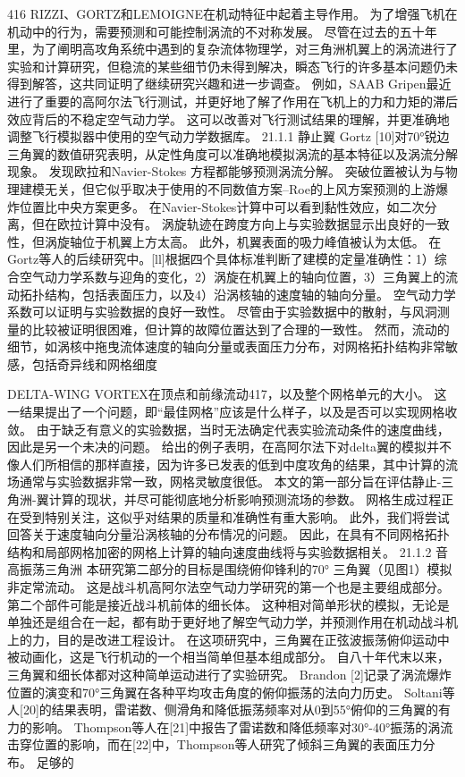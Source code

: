 \documentclass[UTF8,11pt,a4paper,openany,fontset=fandol]{ctexbook}
\begin{document}
416 RIZZI、GORTZ和LEMOIGNE在机动特征中起着主导作用。 为了增强飞机在机动中的行为，需要预测和可能控制涡流的不对称发展。 尽管在过去的五十年里，为了阐明高攻角系统中遇到的复杂流体物理学，对三角洲机翼上的涡流进行了实验和计算研究，但稳流的某些细节仍未得到解决，瞬态飞行的许多基本问题仍未得到解答，这共同证明了继续研究兴趣和进一步调查。 例如，SAAB Gripen最近进行了重要的高阿尔法飞行测试，并更好地了解了作用在飞机上的力和力矩的滞后效应背后的不稳定空气动力学。 这可以改善对飞行测试结果的理解，并更准确地调整飞行模拟器中使用的空气动力学数据库。 21.1.1 静止翼 Gortz [10]对70°锐边三角翼的数值研究表明，从定性角度可以准确地模拟涡流的基本特征以及涡流分解现象。 发现欧拉和Navier-Stokes 方程都能够预测涡流分解。 突破位置被认为与物理建模无关，但它似乎取决于使用的不同数值方案--Roe的上风方案预测的上游爆炸位置比中央方案更多。 在Navier-Stokes计算中可以看到黏性效应，如二次分离，但在欧拉计算中没有。 涡旋轨迹在跨度方向上与实验数据显示出良好的一致性，但涡旋轴位于机翼上方太高。 此外，机翼表面的吸力峰值被认为太低。 在Gortz等人的后续研究中。[ll]根据四个具体标准判断了建模的定量准确性：1）综合空气动力学系数与迎角的变化，2）涡旋在机翼上的轴向位置，3）三角翼上的流动拓扑结构，包括表面压力，以及4）沿涡核轴的速度轴的轴向分量。 空气动力学系数可以证明与实验数据的良好一致性。 尽管由于实验数据中的散射，与风洞测量的比较被证明很困难，但计算的故障位置达到了合理的一致性。 然而，流动的细节，如涡核中拖曳流体速度的轴向分量或表面压力分布，对网格拓扑结构非常敏感，包括奇异线和网格细度

DELTA-WING VORTEX在顶点和前缘流动417，以及整个网格单元的大小。 这一结果提出了一个问题，即“最佳网格”应该是什么样子，以及是否可以实现网格收敛。 由于缺乏有意义的实验数据，当时无法确定代表实验流动条件的速度曲线，因此是另一个未决的问题。 给出的例子表明，在高阿尔法下对delta翼的模拟并不像人们所相信的那样直接，因为许多已发表的低到中度攻角的结果，其中计算的流场通常与实验数据非常一致，网格灵敏度很低。 本文的第一部分旨在评估静止-三角洲-翼计算的现状，并尽可能彻底地分析影响预测流场的参数。 网格生成过程正在受到特别关注，这似乎对结果的质量和准确性有重大影响。 此外，我们将尝试回答关于速度轴向分量沿涡核轴的分布情况的问题。 因此，在具有不同网格拓扑结构和局部网格加密的网格上计算的轴向速度曲线将与实验数据相关。 21.1.2 音高振荡三角洲 本研究第二部分的目标是围绕俯仰锋利的70° 三角翼（见图1）模拟非定常流动。 这是战斗机高阿尔法空气动力学研究的第一个也是主要组成部分。 第二个部件可能是接近战斗机前体的细长体。 这种相对简单形状的模拟，无论是单独还是组合在一起，都有助于更好地了解空气动力学，并预测作用在机动战斗机上的力，目的是改进工程设计。 在这项研究中，三角翼在正弦波振荡俯仰运动中被动画化，这是飞行机动的一个相当简单但基本组成部分。 自八十年代末以来，三角翼和细长体都对这种简单运动进行了实验研究。 Brandon [2]记录了涡流爆炸位置的演变和70°三角翼在各种平均攻击角度的俯仰振荡的法向力历史。 Soltani等人[20]的结果表明，雷诺数、侧滑角和降低振荡频率对从0到55°俯仰的三角翼的有力的影响。 Thompson等人在[21]中报告了雷诺数和降低频率对30°-40°振荡的涡流击穿位置的影响，而在[22]中，Thompson等人研究了倾斜三角翼的表面压力分布。 足够的
\end{document}

